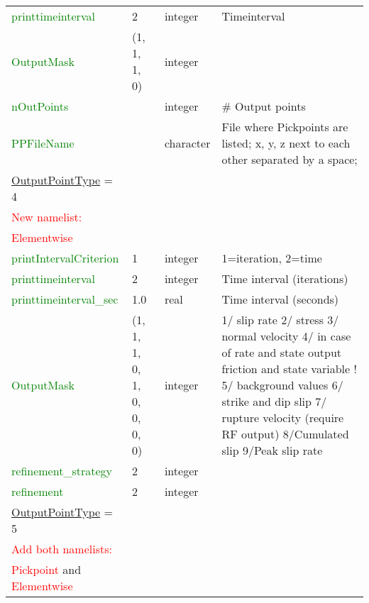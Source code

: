 \documentclass[12pt,twoside]{article}
\begin{document}
\begin{longtable}{|p{4.8cm}|p{2.4cm}|p{2cm}|p{5cm}|}
\textcolor{green}{printtimeinterval} & 2 & integer & Timeinterval\\
\textcolor{green}{OutputMask} & (1, 1, 1, 0) & integer & \\
\textcolor{green}{nOutPoints} & & integer & \# Output points\\
\textcolor{green}{PPFileName} & & character& File where Pickpoints are listed; x, y, z next to each other separated by a space;\\
\hdashline
\uline{OutputPointType} = 4 & & &\\
\textcolor{red}{New namelist:} & & &\\
\textcolor{red}{Elementwise} & & &\\
\textcolor{green}{printIntervalCriterion} & 1 & integer & 1=iteration, 2=time\\
\textcolor{green}{printtimeinterval} & 2 & integer & Time interval (iterations)\\
\textcolor{green}{printtimeinterval\_sec} & 1.0 & real & Time interval (seconds)\\
\textcolor{green}{OutputMask} & (1, 1, 1, 0, 1, 0, 0, 0, 0)& integer & 1/ slip rate 2/ stress 3/ normal velocity 4/ in case of rate and state output friction and state variable
                               ! 5/ background values 6/ strike and dip slip 7/ rupture velocity (require RF output) 8/Cumulated slip 9/Peak slip rate\\
\textcolor{green}{refinement\_strategy} & 2 & integer & \\
\textcolor{green}{refinement} & 2 & integer & \\
\hdashline
\uline{OutputPointType} = 5 & & &\\
\textcolor{red}{Add both namelists:} & & &\\
\textcolor{red}{Pickpoint} and \textcolor{red}{Elementwise} & & &\\
\hline
\end{longtable}
\end{document}
